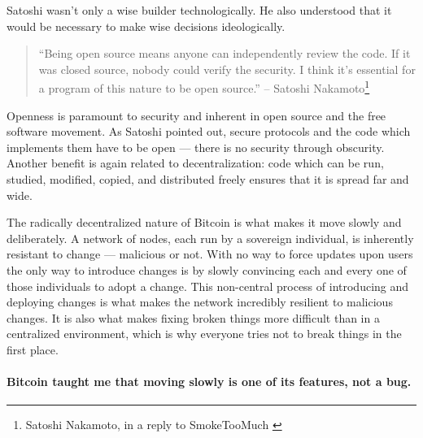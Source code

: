 Satoshi wasn't only a wise builder technologically. He also understood
that it would be necessary to make wise decisions ideologically.

\begin{samepage}\begin{quotation}
``Being open source means anyone can independently review the code. If
it was closed source, nobody could verify the security. I think it's
essential for a program of this nature to be open source.''
\flushright -- Satoshi Nakamoto\footnote{Satoshi Nakamoto, in a reply to SmokeTooMuch \cite{satoshi-open-source}}
\end{quotation}\end{samepage}

Openness is paramount to security and inherent in open source and the
free software movement. As Satoshi pointed out, secure protocols and the
code which implements them have to be open --- there is no security
through obscurity. Another benefit is again related to decentralization:
code which can be run, studied, modified, copied, and distributed freely
ensures that it is spread far and wide.

The radically decentralized nature of Bitcoin is what makes it move
slowly and deliberately. A network of nodes, each run by a sovereign
individual, is inherently resistant to change --- malicious or not. With
no way to force updates upon users the only way to introduce changes is
by slowly convincing each and every one of those individuals to adopt a
change. This non-central process of introducing and deploying changes is
what makes the network incredibly resilient to malicious changes. It is
also what makes fixing broken things more difficult than in a
centralized environment, which is why everyone tries not to break things
in the first place.

\paragraph{Bitcoin taught me that moving slowly is one of its features, not a
bug.}

